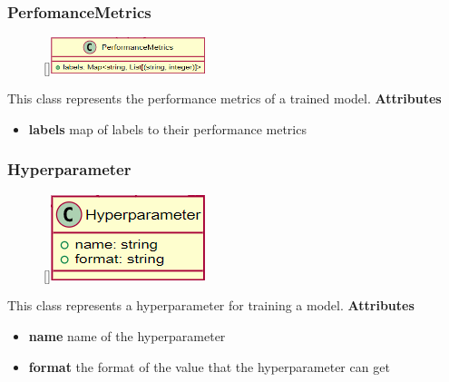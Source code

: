 \subsubsection{PerfomanceMetrics}
\begin{figure}
    \raisebox{0pt}[\dimexpr{}\baselineskip\relax]{\includegraphics[width=4.5cm]{classes/model-management/12.png}}
\end{figure} 
\par
This class represents the performance metrics of a trained model.
\newline
\newline
\textbf{Attributes}
\begin{itemize}
    \item \textbf{labels} map of labels to their performance metrics
\end{itemize}

\subsubsection{Hyperparameter}
\begin{figure}
    \raisebox{0pt}[\dimexpr{}\baselineskip\relax]{\includegraphics[width=4.5cm]{classes/model-management/13.png}}
\end{figure} 
\par
This class represents a hyperparameter for training a model.
\newline
\newline
\textbf{Attributes}
\begin{itemize}
    \item \textbf{name} name of the hyperparameter
    \item \textbf{format} the format of the value that the hyperparameter can get
\end{itemize}

